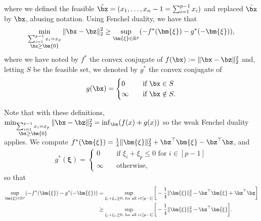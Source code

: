 \documentclass[11pt]{article}
\numberwithin{equation}{section}
\numberwithin{figure}{section}
\begin{document}
where we defined the feasible $\tilde{\bx} = (x_1, \ldots, x_n-1 = \sum_{i =1}^{p-1} x_i)$ and replaced $\tilde{\bx}$ by $\bx$, abusing notation. Using Fenchel duality, we have that 
\begin{align}
     \min_{\substack{\sum_{i =1}^{p-1}x_i = x_{p}\\ \bx \geq \bm{0}}} \Vert \bx -\bz \Vert^2_2 \geq \sup_{\bm{\xi} \in \mathbb{R}^p} (- f^*(\bm{\xi}) - g^*(-\bm{\xi})), 
\end{align}
where we have noted by $f^*$ the convex conjugate of $f(\bx) := \|\bx - \bz\|_2^2$ and, letting $S$ be the feasible set, we denoted by $g^*$ the convex conjugate of 
\begin{align}
g(\bx) = \begin{cases}
    0  &\quad \text{if } \bx \in S \\ 
    \infty &\quad \text{if } \bx \notin S.
\end{cases}
\end{align}

Note that with these definitions, $\min_{\substack{\sum_{i =1}^{p-1}x_i = x_{p}\\ \bx \geq \bm{0}}} \Vert \bx -\bz \Vert^2_2 = \inf_{\bx} (f(x) + g(x))$ so the weak Fenchel duality applies. 
We compute $f^*(\bm{\xi}) = \frac{1}{4} \Vert \bm{\xi} \Vert^2_2 + \bz^\top \bm{\xi} - \bz^\top \bz$, and 
\begin{align}
    g^*(\bm{\xi}) = \begin{cases}
    0 &\quad \text{if } \xi_i+\xi_p \leq 0 \text{ for } i \in [p-1] \\ 
    \infty &\quad \text{otherwise},
\end{cases}    
\end{align}
so that 
\begin{align}
     \sup_{\bm{\xi} \in \mathbb{R}^p} (-f^*(\bm{\xi}) - g^*(-\bm{\xi})) &=  \sup_{\xi_i + \xi_n \geq 0, \text{ for all } i \in [p-1]} \bigg [-\frac{1}{4} \Vert \bm{\xi} \Vert^2_2 - \bz^\top \bm{\xi} + \bz^\top \bz \bigg] \\ &\geq \sup_{\xi_i + \xi_n \geq 0, \text{ for all } i \in [p-1]} \bigg [-\frac{1}{4} \Vert \bm{\xi} \Vert^2_2 - \bz^\top \bm{\xi} \bigg] . 
\end{align}
\end{document}
